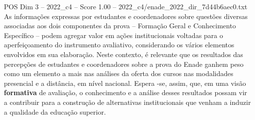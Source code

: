 \begin{textsample}{POS Dim 3 – 2022\_c4 – Score 1.00 – 2022\_c4/enade\_2022\_dir\_7d44b6aec0.txt}
As informações expressas por estudantes e coordenadores sobre questões diversas associadas aos dois componentes da prova – Formação Geral e Conhecimento Específico – podem agregar valor em ações institucionais voltadas para o aperfeiçoamento do instrumento avaliativo, considerando os vários elementos envolvidos em sua elaboração.
Neste contexto, é relevante que os resultados das percepções de estudantes e coordenadores sobre a prova do Enade ganhem peso como um elemento a mais nas análises da oferta dos cursos nas modalidades presencial e a distância, em nível nacional.
Espera -se, assim, que, em uma visão \textbf{formativa} de avaliação, o conhecimento e a análise desses resultados possam vir a contribuir para a construção de alternativas institucionais que venham a induzir a qualidade da educação superior.

\end{textsample}
